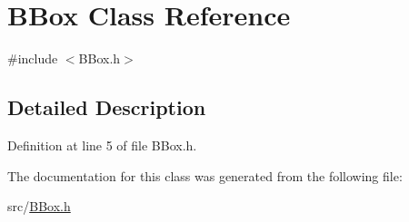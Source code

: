 \hypertarget{class_b_box}{}\section{B\+Box Class Reference}
\label{class_b_box}


{\ttfamily \#include $<$B\+Box.\+h$>$}



\subsection{Detailed Description}


Definition at line 5 of file B\+Box.\+h.



The documentation for this class was generated from the following file\+:\begin{DoxyCompactItemize}
\item 
src/\hyperlink{_b_box_8h}{B\+Box.\+h}\end{DoxyCompactItemize}

